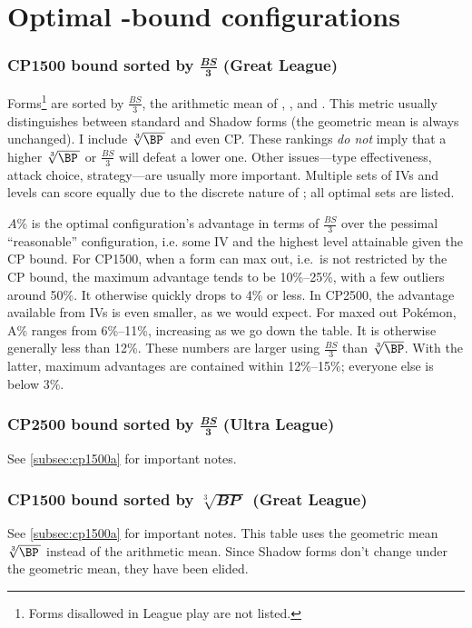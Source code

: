 \chapter{Optimal \CP-bound configurations\label{chap:optimal}}
\subsection[CP1500 bound sorted by $\frac{\mathit{BS}}{3}$ (Great League)]%
{CP1500 bound sorted by $\frac{\mathbfit{BS}}{\mathbf3}$ (Great League)\label{subsec:cp1500a}}

Forms\footnote{Forms disallowed in League play are not listed.} are sorted by $\frac{\mathit{BS}}{3}$,
  the arithmetic mean of , , and \MHP\@.
This metric usually distinguishes between standard and Shadow forms (the geometric mean is always unchanged).
I include $\sqrt[3]{\BP\,}$ and even CP\@.
These rankings \textit{do not} imply that a higher $\sqrt[3]{\BP\,}$ or $\frac{\mathit{BS}}{3}$
  will defeat a lower one.
Other issues---type effectiveness, attack choice, strategy---are usually more important.
Multiple sets of IVs and levels can score equally due to the discrete nature of \MHP\@; all optimal sets are listed.

$A\%$ is the optimal configuration's advantage in terms of $\frac{BS}{3}$
  over the pessimal ``reasonable'' configuration, i.e. some IV
  and the highest level attainable given the CP bound.
For CP1500, when a form can max out, i.e.\ is not restricted by the CP bound,
  the maximum advantage tends to be 10\%--25\%, with a few outliers around 50\%.
It otherwise quickly drops to 4\% or less.
In CP2500, the advantage available from IVs is even smaller, as we would expect.
For maxed out Pokémon, A\% ranges from 6\%--11\%, increasing as we go down the table.
It is otherwise generally less than 12\%.
These numbers are larger using $\frac{\mathit{BS}}{3}$ than $\sqrt[3]{\BP}$.
With the latter, maximum advantages are contained within 12\%--15\%; everyone else is below 3\%.

\subsection[CP2500 bound sorted by $\frac{\mathit{BS}}{3}$ (Ultra League)]%
{CP2500 bound sorted by $\frac{\mathbfit{BS}}{\mathbf3}$ (Ultra League)\label{subsec:cp2500a}}
See \autoref{subsec:cp1500a} for important notes.

\subsection[CP1500 bound sorted by \protect{$\sqrt[3]{\BP\,}$} (Great League)]%
{CP1500 bound sorted by $\sqrt[3]{\mathbfit{BP}\;}$ (Great League)\label{subsec:cp1500g}}
See \autoref{subsec:cp1500a} for important notes.
This table uses the geometric mean $\sqrt[3]{\BP\,}$ instead of the arithmetic mean.
Since Shadow forms don't change under the geometric mean, they have been elided.

